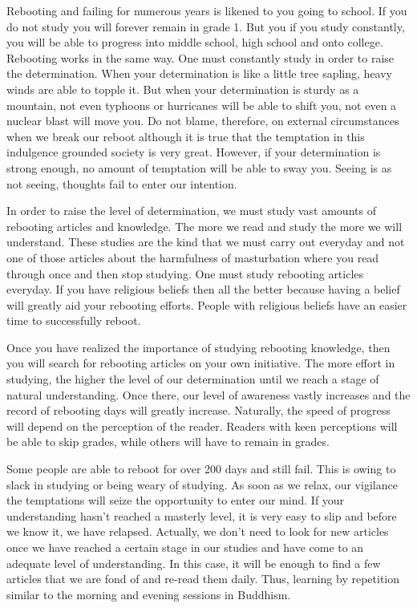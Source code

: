 \documentclass[
]{book}
\begin{document}
Rebooting and failing for numerous years is likened to you going to school. If you do not study you will forever remain in grade 1. But you if you study constantly, you will be able to progress into middle school, high school and onto college. Rebooting works in the same way. One must constantly study in order to raise the determination. When your determination is like a little tree sapling, heavy winds are able to topple it. But when your determination is sturdy as a mountain, not even typhoons or hurricanes will be able to shift you, not even a nuclear blast will move you. Do not blame, therefore, on external circumstances when we break our reboot although it is true that the temptation in this indulgence grounded society is very great. However, if your determination is strong enough, no amount of temptation will be able to sway you. Seeing is as not seeing, thoughts fail to enter our intention.

In order to raise the level of determination, we must study vast amounts of rebooting articles and knowledge. The more we read and study the more we will understand. These studies are the kind that we must carry out everyday and not one of those articles about the harmfulness of masturbation where you read through once and then stop studying. One must study rebooting articles everyday. If you have religious beliefs then all the better because having a belief will greatly aid your rebooting efforts. People with religious beliefs have an easier time to successfully reboot.

Once you have realized the importance of studying rebooting knowledge, then you will search for rebooting articles on your own initiative. The more effort in studying, the higher the level of our determination until we reach a stage of natural understanding. Once there, our level of awareness vastly increases and the record of rebooting days will greatly increase. Naturally, the speed of progress will depend on the perception of the reader. Readers with keen perceptions will be able to skip grades, while others will have to remain in grades.

Some people are able to reboot for over 200 days and still fail. This is owing to slack in studying or being weary of studying. As soon as we relax, our vigilance the temptations will seize the opportunity to enter our mind. If your understanding hasn't reached a masterly level, it is very easy to slip and before we know it, we have relapsed. Actually, we don't need to look for new articles once we have reached a certain stage in our studies and have come to an adequate level of understanding. In this case, it will be enough to find a few articles that we are fond of and re-read them daily. Thus, learning by repetition similar to the morning and evening sessions in Buddhism.
\end{document}
